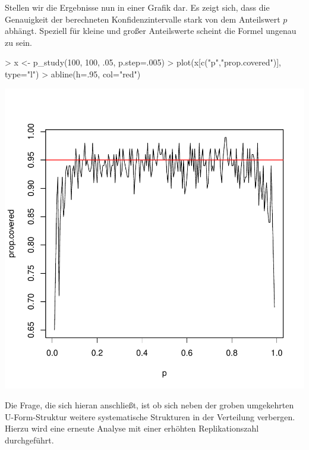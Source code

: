 Stellen wir die Ergebnisse nun in einer Grafik dar. Es zeigt sich, dass die Genauigkeit der berechneten Konfidenzintervalle stark von dem Anteilswert $p$ abhängt. Speziell für kleine und großer Anteilswerte scheint die Formel ungenau zu sein. 

\begin{Schunk}
\begin{Sinput}
> x <- p_study(100, 100, .05, p.step=.005)
> plot(x[c("p","prop.covered")], type="l") 
> abline(h=.95, col="red")
\end{Sinput}
\end{Schunk}
\includegraphics{sim_binomial_prop-010}

Die Frage, die sich hieran anschließt, ist ob sich neben der groben umgekehrten U-Form-Struktur weitere systematische Strukturen in der Verteilung verbergen. Hierzu wird eine erneute Analyse mit einer erhöhten Replikationszahl durchgeführt. 
 
